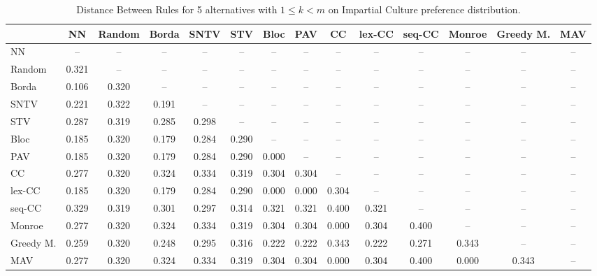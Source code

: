 
\begin{table*}
\centering
\begin{tabular}{lccccccccccccc}
\toprule
 & NN & Random & Borda & SNTV & STV & Bloc & PAV & CC & lex-CC & seq-CC & Monroe & Greedy M. & MAV \\
\midrule
NN & -- & -- & -- & -- & -- & -- & -- & -- & -- & -- & -- & -- & -- \\
Random & 0.321 & -- & -- & -- & -- & -- & -- & -- & -- & -- & -- & -- & -- \\
Borda & 0.106 & 0.320 & -- & -- & -- & -- & -- & -- & -- & -- & -- & -- & -- \\
SNTV & 0.221 & 0.322 & 0.191 & -- & -- & -- & -- & -- & -- & -- & -- & -- & -- \\
STV & 0.287 & 0.319 & 0.285 & 0.298 & -- & -- & -- & -- & -- & -- & -- & -- & -- \\
Bloc & 0.185 & 0.320 & 0.179 & 0.284 & 0.290 & -- & -- & -- & -- & -- & -- & -- & -- \\
PAV & 0.185 & 0.320 & 0.179 & 0.284 & 0.290 & 0.000 & -- & -- & -- & -- & -- & -- & -- \\
CC & 0.277 & 0.320 & 0.324 & 0.334 & 0.319 & 0.304 & 0.304 & -- & -- & -- & -- & -- & -- \\
lex-CC & 0.185 & 0.320 & 0.179 & 0.284 & 0.290 & 0.000 & 0.000 & 0.304 & -- & -- & -- & -- & -- \\
seq-CC & 0.329 & 0.319 & 0.301 & 0.297 & 0.314 & 0.321 & 0.321 & 0.400 & 0.321 & -- & -- & -- & -- \\
Monroe & 0.277 & 0.320 & 0.324 & 0.334 & 0.319 & 0.304 & 0.304 & 0.000 & 0.304 & 0.400 & -- & -- & -- \\
Greedy M. & 0.259 & 0.320 & 0.248 & 0.295 & 0.316 & 0.222 & 0.222 & 0.343 & 0.222 & 0.271 & 0.343 & -- & -- \\
MAV & 0.277 & 0.320 & 0.324 & 0.334 & 0.319 & 0.304 & 0.304 & 0.000 & 0.304 & 0.400 & 0.000 & 0.343 & -- \\
\bottomrule
\end{tabular}

\caption{Distance Between Rules for 5 alternatives with $1 \leq k < m$ on Impartial Culture preference distribution.}
\end{table*}
